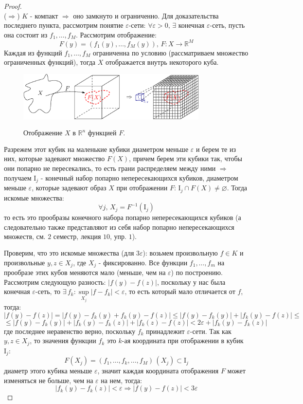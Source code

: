 \documentclass[12pt]{article}
\newcommand{\MR}{\mathbb{R}}
\newcommand{\MI}{\mathrm{I}}
\newcommand{\VN}{\varnothing}
\newcommand{\VE}{\varepsilon}
\theoremstyle{definition}
\begin{document}
\begin{proof}\hfill\\ 
	($\Rightarrow$) $K$ - компакт $\Rightarrow$ оно замкнуто и ограниченно. Для доказательства последнего пункта, рассмотрим понятие $\VE$-сети: $\forall \VE > 0, \, \exists$ конечная $\VE$-сеть, пусть она состоит из $f_1, \dotsc, f_M$. Рассмотрим отображение:
	$$
		F(y) = (f_1(y), \dotsc, f_M(y)), \, F \colon X \to \MR^M
	$$
	Каждая из функций $f_1, \dotsc, f_M$ ограниченна по условию (рассматриваем множество ограниченных функций), тогда $X$ отображается внутрь некоторого куба.
	\begin{figure}[H]
		\centering
		\includegraphics[width=0.85\textwidth]{MA3L11_1.eps}
		\label{MA3L11_1}
		\caption{Отображение $X$ в $\MR^n$ функцией $F$.}
		\label{fig:Покрытие	}
	\end{figure}
	Разрежем этот кубик на маленькие кубики диаметром меньше $\VE$ и берем те из них, которые задевают множество $F(X)$, причем берем эти кубики так, чтобы они попарно не пересекались, то есть грани распределяем между ними $\Rightarrow$ получаем $\MI_j$ - конечный набор попарно непересекающихся кубиков, диаметром меньше $\VE$, которые задевают образ $X$ при отображении $F$: $\MI_j \cap F(X) \neq \VN$. Тогда искомые множества:
	$$
		\forall j, \, X_j = F^{-1}(\MI_j)
	$$
	то есть это прообразы конечного набора попарно непересекающихся кубиков (а следовательно также представляют из себя набор попарно непересекающихся множеств, см. $2$ семестр, лекция $10$, упр. $1$).
	
	Проверим, что это искомые множества (для $3\VE$): возьмем произвольную $f \in K$ и произвольные $y,z \in X_j$, где $X_j$ - фиксированно. Все функции $f_1, \dotsc, f_m$ на прообразе этих кубов меняются мало (меньше, чем на $\VE$) по построению. Рассмотрим следующую разность: $|f(y) - f(z)|$, поскольку у нас была конечная $\VE$-сеть, то $\exists \, f_k \colon \sup\limits_{X_j}|f - f_k| < \VE$, то есть который мало отличается от $f$, тогда:  
	$$
		|f(y) - f(z)| = |f(y) - f_k(y) + f_k(y) - f(z)| \leq |f(y) - f_k(y)|  + |f_k(y) - f(z)| \leq
	$$
	$$
		\leq |f(y) - f_k(y)|  + |f_k(y) - f_k(z)| + |f_k(z) - f(z)| < 2\VE + |f_k(y) - f_k(z)|
	$$
	где последнее неравенство верно, поскольку $f_k$ принадлежит $\VE$-сети. Так как $y, z \in X_j$, то значения функции $f_k$ это $k$-ая координата при отображении в кубик $\MI_j$:
	$$
		F(X_j) = (f_1, \dotsc, f_k, \dotsc, f_M) \, (X_j) \subset \MI_j
	$$
	диаметр этого кубика меньше $\VE$, значит каждая координата отображения $F$ может изменяться не больше, чем на $\VE$ на нем, тогда:
	$$
		|f_k(y) - f_k(z)| < \VE \Rightarrow |f(y) - f(z)| < 3\VE
	$$
	

\end{proof}
\end{document}
